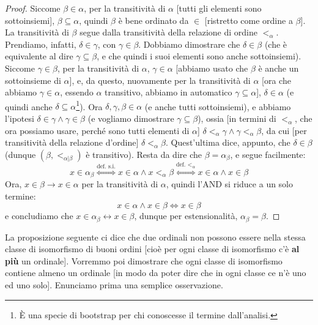 \documentclass[11pt]{scrartcl}
\begin{document}
\begin{proof}
	Siccome $\beta \in \alpha$, per la transitività di $\alpha$ [tutti gli elementi sono sottoinsiemi], $\beta \subseteq \alpha$, quindi $\beta$ è bene ordinato da $\in$ [ristretto come ordine a $\beta$].
	La transitività di $\beta$ segue dalla transitività della relazione di ordine $<_{\alpha}$. Prendiamo, infatti, $\delta \in \gamma$, con $\gamma \in \beta$. Dobbiamo 
	dimostrare che $\delta \in \beta$ (che è equivalente al dire $\gamma \subseteq \beta$, e che quindi i suoi elementi sono anche sottoinsiemi).\\
	Siccome $\gamma \in \beta$, per la transitività di $\alpha$, $\gamma \in \alpha$ [abbiamo usato che $\beta$ è anche un sottoinsieme di $\alpha$], e, da questo, nuovamente per la transitività di $\alpha$ [ora che abbiamo $\gamma \in \alpha$, essendo $\alpha$ transitivo, 
	abbiamo in automatico $\gamma \subseteq \alpha$], $\delta \in \alpha$ (e quindi anche $\delta \subseteq \alpha$\footnote{È una specie di bootstrap per chi conoscesse il termine dall'analisi.}). Ora $\delta,\gamma,\beta \in \alpha$ (e anche tutti sottoinsiemi), e abbiamo 
	l'ipotesi $\delta \in \gamma \land \gamma \in \beta$ (e vogliamo dimostrare $\gamma \subseteq \beta$), ossia [in termini di $<_\alpha$, che ora possiamo usare, perché sono tutti elementi di $\alpha$] $\delta <_\alpha \gamma \land \gamma <_\alpha \beta$, da cui [per transitività della relazione d'ordine] $\delta <_\alpha \beta$.
	Quest'ultima dice, appunto, che $\delta \in \beta$ (dunque $(\beta,<_{\alpha|\beta})$ è transitivo).
	Resta da dire che $\beta = \alpha_\beta$, e segue facilmente:
	\[ x \in \alpha_\beta \overset{\text{def. s.i.}}{\iff} x \in \alpha \land x <_\alpha \beta \overset{\text{def. $<_\alpha$}}{\iff} x \in \alpha \land x \in \beta
		\]
	Ora, $x \in \beta \rightarrow x \in \alpha$ per la transitività di $\alpha$, quindi l'AND si riduce a un solo termine:
	\[ x \in \alpha \land x \in \beta \iff x \in \beta
		\]
	e concludiamo che $x \in \alpha_\beta \leftrightarrow x \in \beta$, dunque per estensionalità, $\alpha_\beta = \beta$.
\end{proof}

La proposizione seguente ci dice che due ordinali non possono essere nella stessa classe di isomorfismo di buoni ordini [cioè per ogni classe di isomorfismo c'è \textbf{al più} un ordinale]. Vorremmo poi dimostrare che ogni classe 
di isomorfismo contiene almeno un ordinale [in modo da poter dire che in ogni classe ce n'è uno ed uno solo]. Enunciamo prima una semplice osservazione.
\end{document}
